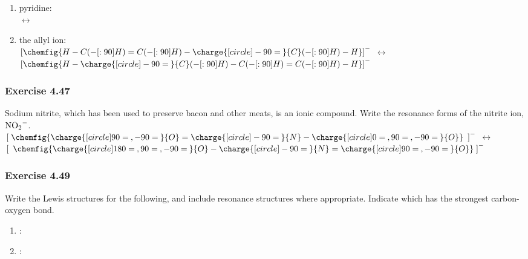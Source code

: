 \documentclass[11pt]{article}
\begin{document}
\begin{enumerate}
\item  pyridine: \\[2ex]

\qquad $\longleftrightarrow$ \qquad
{}

\item  the allyl ion: \\[2ex]

$\left[
\chemfig{
    H
    -C (-[:90]H)
    =C (-[:90]H)
    -\charge{[circle]-90=\:}{C} (-[:90]H)
    -H
}
\right]^-$
\qquad $\longleftrightarrow$ \qquad
$\left[
\chemfig{
    H
    -\charge{[circle]-90=\:}{C} (-[:90]H)
    -C (-[:90]H)
    =C (-[:90]H)
    -H
}
\right]^-$

\end{enumerate}

\subsubsection{Exercise 4.47}

Sodium nitrite, which has been used to preserve bacon and other meats, is an ionic compound. Write the resonance forms of the nitrite ion, $\ce{NO2^-}$.\\[2ex]

$\left[\;
\chemfig{
    \charge{[circle]90=\:,-90=\:}{O}
    =\charge{[circle]-90=\:}{N}
    -\charge{[circle]0=\:,90=\:,-90=\:}{O}
}
\enspace\right]^-$
\qquad $\longleftrightarrow$ \qquad
$\left[\enspace
\chemfig{
    \charge{[circle]180=\:,90=\:,-90=\:}{O}
    -\charge{[circle]-90=\:}{N}
    =\charge{[circle]90=\:,-90=\:}{O}
}
\;\right]^-$

\subsubsection{Exercise 4.49}

Write the Lewis structures for the following, and include resonance structures where appropriate. Indicate which has the strongest carbon-oxygen bond.

\begin{enumerate}

\item {}: \qquad
{}

\item {}: \qquad
{}

\end{enumerate}
\end{document}
